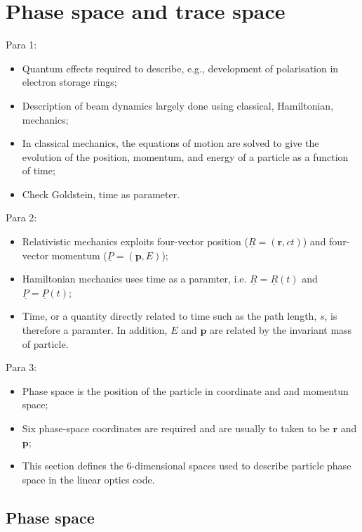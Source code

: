 \graphicspath{ {03-PhaseTraceSpace/Figures/} }

\section{Phase space and trace space}

Para 1:
\begin{itemize}
  \item Quantum effects required to describe, e.g., development of
    polarisation in electron storage rings;
  \item Description of beam dynamics largely done using classical,
    Hamiltonian, mechanics;
  \item In classical mechanics, the equations of motion are solved to
    give the evolution of the position, momentum, and energy of a
    particle as a function of time;
  \item Check Goldstein, time as parameter.
\end{itemize}

Para 2:
\begin{itemize}
  \item Relativistic mechanics exploits four-vector position
    ($\underline{R} = (\bm{r}, ct)$) and four-vector momentum
    ($\underline{P} = (\bm{p}, E)$); 
  \item Hamiltonian mechanics uses time as a paramter, i.e.
    $\underline{R} = \underline{R}(t)$ and
    $\underline{P} = \underline{P}(t)$;
  \item Time, or a quantity directly related to time such as the path
    length, $s$, is therefore a paramter.
    In addition, $E$ and $\bm{p}$ are related by the invariant mass of
    particle.
\end{itemize}

Para 3:
\begin{itemize}
  \item Phase space is the position of the particle in coordinate and
    and momentun space;
  \item Six phase-space coordinates are required and are usually to
    taken to be $\bm{r}$ and $\bm{p}$;
  \item This section defines the 6-dimensional spaces used to describe
    particle phase space in the linear optics code.
\end{itemize}

\subsection{Phase space}

